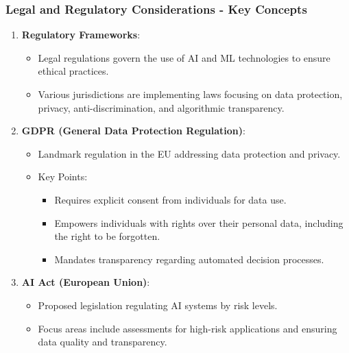 \documentclass{beamer}
\begin{document}
\begin{frame}[fragile]
    \frametitle{Legal and Regulatory Considerations - Key Concepts}
    \begin{enumerate}
        \item \textbf{Regulatory Frameworks}:
        \begin{itemize}
            \item Legal regulations govern the use of AI and ML technologies to ensure ethical practices.
            \item Various jurisdictions are implementing laws focusing on data protection, privacy, anti-discrimination, and algorithmic transparency.
        \end{itemize}
        
        \item \textbf{GDPR (General Data Protection Regulation)}:
        \begin{itemize}
            \item Landmark regulation in the EU addressing data protection and privacy.
            \item Key Points:
            \begin{itemize}
                \item Requires explicit consent from individuals for data use.
                \item Empowers individuals with rights over their personal data, including the right to be forgotten.
                \item Mandates transparency regarding automated decision processes.
            \end{itemize}
        \end{itemize}
        
        \item \textbf{AI Act (European Union)}:
        \begin{itemize}
            \item Proposed legislation regulating AI systems by risk levels.
            \item Focus areas include assessments for high-risk applications and ensuring data quality and transparency.
        \end{itemize}
    \end{enumerate}
\end{frame}
\end{document}
